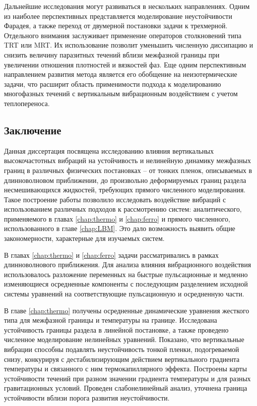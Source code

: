 \documentclass[12pt,a4paper]{article}
\begin{document}
Дальнейшие исследования могут развиваться в нескольких направлениях.
Одним из наиболее перспективных представляется моделирование неустойчивости Фарадея, а также переход от двумерной постановки задачи к трехмерной. Отдельного внимания заслуживает применение операторов столкновений типа TRT или MRT. Их использование позволит уменьшить численную диссипацию и снизить величину паразитных течений вблизи межфазной границы при увеличении отношения плотностей и вязкостей фаз. Еще одним перспективным направлением развития метода является его обобщение на неизотермические задачи, что расширит область применимости подхода к моделированию многофазных течений с вертикальным вибрационным воздействием с учетом теплопереноса.


\newpage

\begin{center}
	\section*{Заключение}  
\end{center}

Данная диссертация посвящена исследованию влияния вертикальных высокочастотных вибраций на устойчивость и нелинейную динамику межфазных границ в различных физических постановках -- от тонких пленок, описываемых в длинноволновом приближении, до произвольно деформируемых границ раздела несмешивающихся жидкостей, требующих прямого численного моделирования. Такое построение работы позволило исследовать воздействие вибраций с использованием различных подходов к рассмотрению систем: аналитического, применяемого в главах \ref{chap:thermo} и \ref{chap:ferro} и прямого численного, использованного в главе \ref{chap:LBM}. Это дало возможность выявить общие закономерности, характерные для изучаемых систем. 

В главах \ref{chap:thermo} и \ref{chap:ferro} задачи рассматривались в рамках длинноволнового приближения. Для анализа влияния вибрационного воздействия использовалось разложение переменных на быстрые пульсационные и медленно изменяющиеся осредненные компоненты с последующим разделением исходной системы уравнений на соответствующие пульсационную и осредненную части.

В главе \ref{chap:thermo} получены осредненные динамические уравнения жесткого типа для межфазной границы и температуры на границе. Исследована устойчивость границы раздела в линейной постановке, а также проведено численное моделирование нелинейных уравнений. Показано, что вертикальные вибрации способны подавлять неустойчивость тонкой пленки, подогреваемой снизу, конкурируя с дестабилизирующим действием вертикального градиента температуры и связанного с ним термокапиллярного эффекта. Построены карты устойчивости течений при разном значении градиента температуры и для разных гравитационных условий. Проведен слабонелинейный анализ, уточнена граница устойчивости вблизи порога развития неустойчивости.
\end{document}
